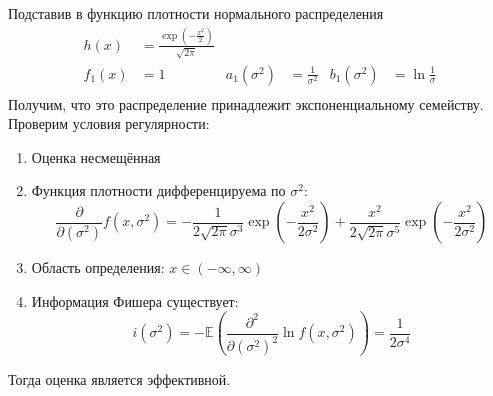 \documentclass{article}
\begin{document}
\begin{enumerate}
	      Подставив в функцию плотности нормального распределения
	      \begin{equation*}
		      \begin{aligned}
			      h(x)   & = \frac{\exp \left( -\frac{x^2}{2} \right) }{\sqrt{2\pi}} &               &                      &               &                         \\
			      f_1(x) & = 1                                                       & a_1(\sigma^2) & = \frac{1}{\sigma^2} & b_1(\sigma^2) & = \ln{\frac{1}{\sigma}} \\
		      \end{aligned}
	      \end{equation*}
	      Получим, что это распределение принадлежит экспоненциальному семейству.
	      Проверим условия регулярности:
	      \begin{enumerate}
		      \item Оценка несмещённая
		      \item Функция плотности дифференцируема по $\sigma^2$:
                    \[
                        \frac{\partial}{\partial (\sigma^2)} f(x, \sigma^2) =
                        -\frac{1}{2\sqrt{2 \pi} \sigma^3} \exp\left(-\frac{x^2}{2\sigma^2}\right) +
                        \frac{x^2}{2\sqrt{2 \pi} \sigma^5} \exp\left(-\frac{x^2}{2\sigma^2}\right)
                    \]
		      \item Область определения: $x \in (-\infty, \infty)$
		      \item Информация Фишера существует:
		            \[
			            i(\sigma^2) =
			            -\mathbb{E}\left(\frac{\partial^2}{\partial
				            (\sigma^2)^2} \ln f(x, \sigma^2)\right) =
			            \frac{1}{2\sigma^4}
		            \]
	      \end{enumerate}

	      Тогда оценка является эффективной.



\end{enumerate}
\end{document}
